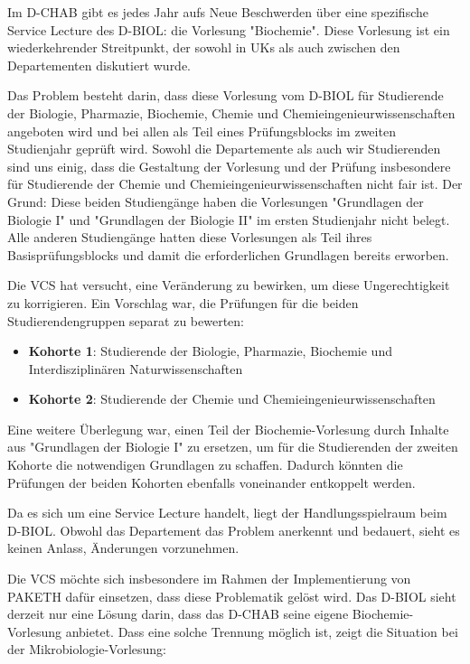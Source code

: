 \documentclass{article}
\begin{document}
Im D-CHAB gibt es jedes Jahr aufs Neue Beschwerden über eine spezifische Service Lecture des D-BIOL: die Vorlesung "Biochemie". Diese Vorlesung ist ein wiederkehrender Streitpunkt, der sowohl in UKs als auch zwischen den Departementen diskutiert wurde.

Das Problem besteht darin, dass diese Vorlesung vom D-BIOL für Studierende der Biologie, Pharmazie, Biochemie, Chemie und Chemieingenieurwissenschaften angeboten wird und bei allen als Teil eines Prüfungsblocks im zweiten Studienjahr geprüft wird. Sowohl die Departemente als auch wir Studierenden sind uns einig, dass die Gestaltung der Vorlesung und der Prüfung insbesondere für Studierende der Chemie und Chemieingenieurwissenschaften nicht fair ist. Der Grund: Diese beiden Studiengänge haben die Vorlesungen "Grundlagen der Biologie I" und "Grundlagen der Biologie II" im ersten Studienjahr nicht belegt. Alle anderen Studiengänge hatten diese Vorlesungen als Teil ihres Basisprüfungsblocks und damit die erforderlichen Grundlagen bereits erworben.  

Die VCS hat versucht, eine Veränderung zu bewirken, um diese Ungerechtigkeit zu korrigieren. Ein Vorschlag war, die Prüfungen für die beiden Studierendengruppen separat zu bewerten:

\begin{itemize}
    \item \textbf{Kohorte 1}: Studierende der Biologie, Pharmazie, Biochemie und Interdisziplinären Naturwissenschaften
    \item \textbf{Kohorte 2}: Studierende der Chemie und Chemieingenieurwissenschaften
\end{itemize}

Eine weitere Überlegung war, einen Teil der Biochemie-Vorlesung durch Inhalte aus "Grundlagen der Biologie I" zu ersetzen, um für die Studierenden der zweiten Kohorte die notwendigen Grundlagen zu schaffen. Dadurch könnten die Prüfungen der beiden Kohorten ebenfalls voneinander entkoppelt werden.  

Da es sich um eine Service Lecture handelt, liegt der Handlungsspielraum beim D-BIOL. Obwohl das Departement das Problem anerkennt und bedauert, sieht es keinen Anlass, Änderungen vorzunehmen.  

Die VCS möchte sich insbesondere im Rahmen der Implementierung von PAKETH dafür einsetzen, dass diese Problematik gelöst wird. Das D-BIOL sieht derzeit nur eine Lösung darin, dass das D-CHAB seine eigene Biochemie-Vorlesung anbietet. Dass eine solche Trennung möglich ist, zeigt die Situation bei der Mikrobiologie-Vorlesung:
\end{document}
